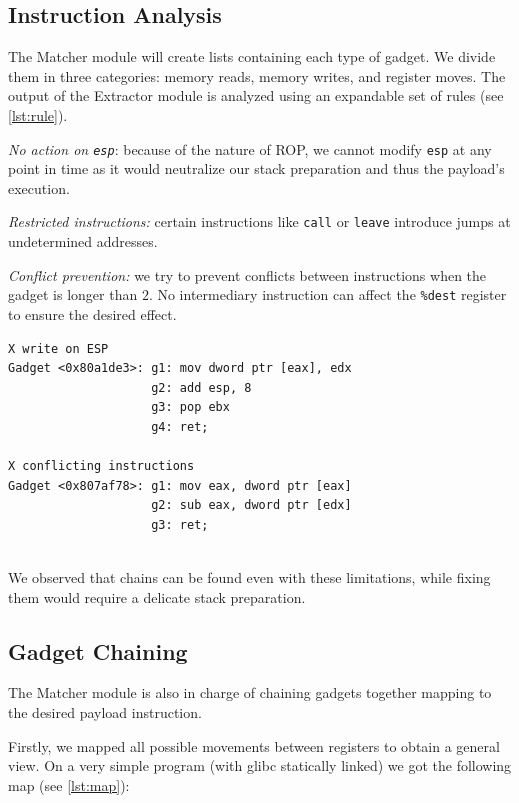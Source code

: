 \documentclass[10pt,twocolumn]{article}
\begin{document}
\subsection{Instruction Analysis}

The Matcher module will create lists containing each type of gadget. We
divide them in three categories: memory reads, memory writes, and register
moves. The output of the Extractor module is analyzed using an expandable set
of rules (see \autoref{lst:rule}).

\textit{No action on \texttt{esp}}: because of the nature of ROP, we cannot
modify \texttt{esp} at any point in time as it would neutralize our stack
preparation and thus the payload's execution.

\textit{Restricted instructions:} certain instructions like \texttt{call} or
\texttt{leave} introduce jumps at undetermined addresses.

\textit{Conflict prevention:} we try to prevent conflicts between instructions when the
gadget is longer than $2$. No intermediary instruction can affect the
\texttt{\%dest} register to ensure the desired effect.


\begin{lstlisting}[float=h,aboveskip=\medskipamount,belowskip=0pt,caption=Rule
verification,label=lst:rule]
X write on ESP
Gadget <0x80a1de3>: g1: mov dword ptr [eax], edx
                    g2: add esp, 8
                    g3: pop ebx
                    g4: ret;

X conflicting instructions
Gadget <0x807af78>: g1: mov eax, dword ptr [eax]
                    g2: sub eax, dword ptr [edx]
                    g3: ret;


\end{lstlisting}

We observed that chains can be found even with these limitations, while fixing
them would require a delicate stack preparation.



\subsection{Gadget Chaining}

The Matcher module is also in charge of chaining gadgets together mapping to
the desired payload instruction. 

Firstly, we mapped all possible movements between registers to obtain a general
view. On a very simple program (with glibc statically linked) we got the
following map (see \autoref{lst:map}):
\end{document}
